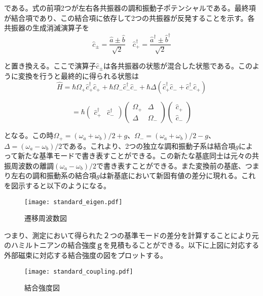         である。式の前項2つが左右各共振器の調和振動子ポテンシャルである。最終項が結合項であり、この結合項に依存して2つの共振器が反発することを示す。各共振器の生成消滅演算子を
        \begin{equation}
            \hat{c}_{\pm}=\frac{\hat{a} \pm \hat{b}}{\sqrt{2}} \quad \hat{c}_{+}^{\dagger}=\frac{\hat{a}^{\dagger} \pm \hat{b}^{\dagger}}{\sqrt{2}}
        \end{equation}

        と置き換える。ここで演算子$\hat{c}_{\pm}$は各共振器の状態が混合した状態である。このように変換を行うと最終的に得られる状態は
        \begin{equation}
            \hat{H}=\hbar \Omega_+\hat{c}^{\dagger}_+\hat{c}_+ + \hbar \Omega_-\hat{c}^{\dagger}_-\hat{c}_- + \hbar \Delta\left(\hat{c}^{\dagger}_+ \hat{c}_- +\hat{c}^{\dagger}_- \hat{c}_{+}\right)
        \end{equation}

        \begin{equation}
            =\hbar\left(\begin{array}{cc}
            \hat{c}^{\dagger}_{+} & \hat{c}^{\dagger}_-
            \end{array}\right)\left(\begin{array}{cc}
            \Omega_{+} & \Delta \\
            \Delta & \Omega_{-}
            \end{array}\right)\left(\begin{array}{l}
            \hat{c}_{+} \\
            \hat{c}_{-}
            \end{array}\right)
        \end{equation}

        となる。この時$\Omega_+ = (\omega_a+\omega_b)/2 + g$、$\Omega_- = (\omega_a+\omega_b)/2 - g$、$\Delta = (\omega_a-\omega_b)/2$である。これより、2つの独立な調和振動子系は結合項$g$によって新たな基準モードで書き表すことができる。この新たな基底同士は元々の共振周波数の離調$(\omega_a-\omega_b)/2$で書き表すことができる。また変換前の基底、つまり左右の調和振動系の結合項$g$は新基底において新固有値の差分に現れる。これを図示すると以下のようになる。
        \begin{figure}[H]
            \centering
            \texttt{[image: standard\_eigen.pdf]}
            \caption{遷移周波数図}
        \end{figure}
        つまり、測定において得られた２つの基準モードの差分を計算することにより元のハミルトニアンの結合強度ｇを見積もることができる。以下に上図に対応する外部磁束に対応する結合強度の図をプロットする。
        \begin{figure}[H]
            \centering
            \texttt{[image: standard\_coupling.pdf]}
            \caption{結合強度図}
        \end{figure}

